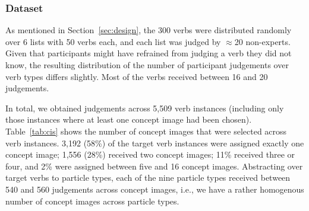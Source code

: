 \documentclass[output=paper]{langsci/langscibook}
\begin{document}
\vspace{+2mm}
\subsubsection{Dataset}

As mentioned in Section~\ref{sec:design}, the 300 verbs were
distributed randomly over 6 lists with 50 verbs each, and each list
was judged by $\approx$20 non-experts. Given that participants might
have refrained from judging a verb they did not know, the resulting
distribution of the number of participant judgements over verb types
differs slightly.
Most of the verbs received between 16 and 20 judgements.

%
%
%

In total, we obtained judgements across 5,509 verb instances
(including only those instances where at least one concept image had
been chosen).
Table~\ref{tab:cis} shows the number of concept images that were selected across
verb instances.  3,192 (58\%) of the target verb instances were
assigned exactly one concept image; 1,556 (28\%) received two concept
images; 11\% received three or four, and 2\% were assigned between
five and 16 concept images. Abstracting over target verbs to particle
types, each of the nine particle types received between 540 and 560
judgements across concept images, i.e., we have a rather homogenous number of concept images
across particle types.

\clearpage
\begin{table}
  \caption{Number of selected concept images per verb instance.\label{tab:cis}}
\end{table}
\end{document}

